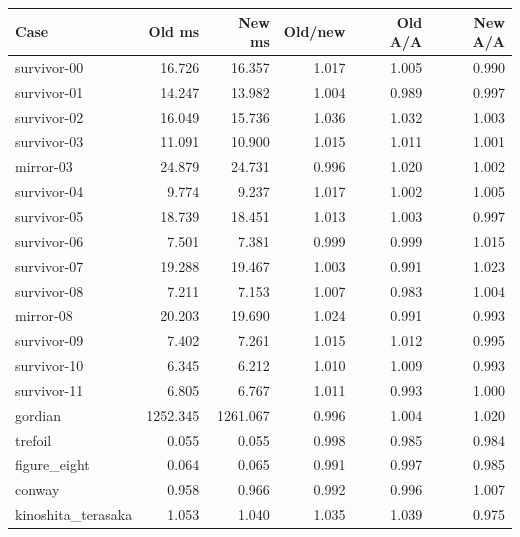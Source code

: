 \begin{center}\small
\begin{tabular}{lrrrrr}
\toprule
Case & Old ms & New ms & Old/new & Old A/A & New A/A \\
\midrule
survivor-00 & 16.726 & 16.357 & 1.017 & 1.005 & 0.990 \\
survivor-01 & 14.247 & 13.982 & 1.004 & 0.989 & 0.997 \\
survivor-02 & 16.049 & 15.736 & 1.036 & 1.032 & 1.003 \\
survivor-03 & 11.091 & 10.900 & 1.015 & 1.011 & 1.001 \\
mirror-03 & 24.879 & 24.731 & 0.996 & 1.020 & 1.002 \\
survivor-04 & 9.774 & 9.237 & 1.017 & 1.002 & 1.005 \\
survivor-05 & 18.739 & 18.451 & 1.013 & 1.003 & 0.997 \\
survivor-06 & 7.501 & 7.381 & 0.999 & 0.999 & 1.015 \\
survivor-07 & 19.288 & 19.467 & 1.003 & 0.991 & 1.023 \\
survivor-08 & 7.211 & 7.153 & 1.007 & 0.983 & 1.004 \\
mirror-08 & 20.203 & 19.690 & 1.024 & 0.991 & 0.993 \\
survivor-09 & 7.402 & 7.261 & 1.015 & 1.012 & 0.995 \\
survivor-10 & 6.345 & 6.212 & 1.010 & 1.009 & 0.993 \\
survivor-11 & 6.805 & 6.767 & 1.011 & 0.993 & 1.000 \\
gordian & 1252.345 & 1261.067 & 0.996 & 1.004 & 1.020 \\
trefoil & 0.055 & 0.055 & 0.998 & 0.985 & 0.984 \\
figure\_eight & 0.064 & 0.065 & 0.991 & 0.997 & 0.985 \\
conway & 0.958 & 0.966 & 0.992 & 0.996 & 1.007 \\
kinoshita\_terasaka & 1.053 & 1.040 & 1.035 & 1.039 & 0.975 \\
\bottomrule
\end{tabular}
\end{center}
